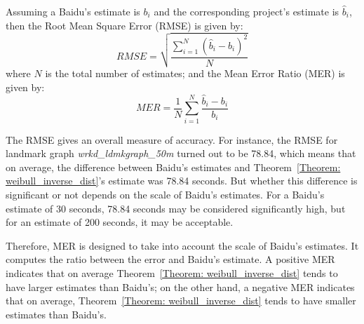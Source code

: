 \begin{table}[h!]
\centering
{}
\caption{Summary of Evaluation Results}\label{Ta:eval_res}
\end{table}

Assuming a Baidu's estimate is $b_{i}$ and the corresponding project's estimate is $\hat{b}_{i}$, then the Root Mean Square Error (RMSE) is given by:
\begin{equation}
RMSE = \sqrt{\frac{\sum_{i = 1}^{N}(\hat{b}_{i} - b_{i})^{2}}{N}}
\end{equation}
where $N$ is the total number of estimates; and the Mean Error Ratio (MER) is given by:
\begin{equation}
MER = \frac{1}{N}\sum_{i = 1}^{N}\frac{\hat{b}_{i} - b_{i}}{b_{i}}
\end{equation}

The RMSE gives an overall measure of accuracy. For instance, the RMSE for landmark graph \emph{wrkd\_ldmkgraph\_50m} turned out to be 78.84, which means that on average, the difference between Baidu's estimates and Theorem~\ref{Theorem: weibull_inverse_dist}'s estimate was 78.84 seconds. But whether this difference is significant or not depends on the scale of Baidu's estimates. For a Baidu's estimate of 30 seconds, 78.84 seconds may be considered significantly high, but for an estimate of 200 seconds, it may be acceptable. 

Therefore, MER is designed to take into account the scale of Baidu's estimates. It computes the ratio between the error and Baidu's estimate. A positive MER indicates that on average Theorem~\ref{Theorem: weibull_inverse_dist} tends to have larger estimates than Baidu's; on the other hand, a negative MER indicates that on average, Theorem~\ref{Theorem: weibull_inverse_dist} tends to have smaller estimates than Baidu's. 

